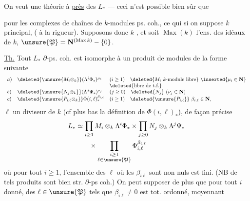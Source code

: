 On veut une théorie à \uline{}
\uline{près} des $L_*$ 
--- ceci n'est possible bien sûr que

pour les complexes de chaînes de $k$-modules
ps. coh., ce qui 
si on suppose $k$ principal, (
à la rigueur). Supposons donc
$k$  
,
et soit $\operatorname{Max}(k)$ l'ens.
des idéaux   de $k$,
$\unsure{\mathfrak P}=\mathbf N^{(\operatorname{Max}k)}-\{0\}$.

\uline{Th.} Tout $L_*$  $\partial$-ps. coh. est isomorphe
à un produit de modules de la
forme suivante
\[
\begin{array}{lll}
a)&\deleted{\unsure{M_i\otimes_k}}(\Lambda^i\Phi_*)^{\mu_i}
 &(i\geq1)\quad\deleted{M_i\ k\text{-module libre}}\ \inserted{\mu_i\in\mathbf N}\\
&&\deleted{\text{libre de t.f.}}\\
b)&\deleted{\unsure{N_j\otimes_k}}(\Lambda^j\Psi_*)^{\nu_j}
 &(j\geq0)\quad\deleted{N_j}\ (\nu_j\in\mathbf N)\\
c)&\deleted{\unsure{P_{i,\ell}\otimes_k}}\Phi(i,\ell)_*^{\beta_{i,\ell}}
 &(i\geq1)\quad\deleted{\unsure{P_{i,\ell}}}\ \beta_{i,\ell}\in\mathbf N,
\end{array}
\]
$\ell$ un  diviseur de $k$ (cf plus bas
la définition de $\Phi(i,\ell)_*$), de façon
précise
\[
\begin{split}
L_*&\simeq\prod_{i\geq1}M_i\otimes_k\Lambda^i\Phi_*
\times\prod_{j\geq0}N_j\otimes_k\Lambda^j\Psi_*\\
&\qquad\times\prod_{\substack{i\geq1\\\ell\in\unsure{\mathfrak P}}}
\Phi_{i,\ell}^{\beta_{i,\ell}}
\end{split}
\]
où pour tout
$i\geq1$, l'ensemble des $\ell$ où les $\beta_{i\ell}$ sont non
nuls est fini. (NB de tels
produits sont bien str. $\partial$-ps coh.)
On peut supposer de plus que pour tout
$i$ donné,  des $\ell\in\unsure{\mathfrak P}$  tels
que $\beta_{i\ell}\neq0$ est tot. ordonné, moyennant

